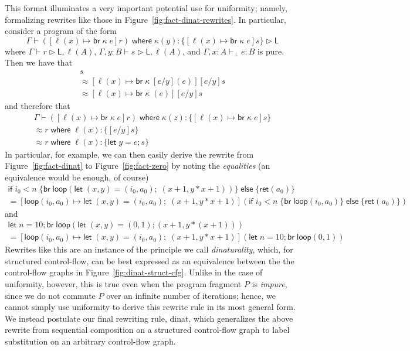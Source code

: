 \documentclass[acmsmall,screen,review]{acmart}
\newcommand{\ms}[1]{\ensuremath{\mathsf{#1}}}
\newcommand{\lto}{:}
\newcommand{\letexpr}[3]{\ensuremath{\ms{let}\;#1 = #2;\;#3}}
\newcommand{\letstmt}[3]{\ensuremath{\ms{let}\;#1 = #2; #3}}
\newcommand{\brb}[2]{\ms{br}\;#1\;#2}
\newcommand{\where}[2]{#1\;\ms{where}\;#2}
\newcommand{\wbranch}[3]{#1(#2) \lto \{#3\}}
\newcommand{\bhyp}[2]{#1 : #2}
\newcommand{\hasty}[4]{#1 \vdash_{#2} #3: {#4}}
\newcommand{\haslb}[3]{#1 \vdash #2 \rhd #3}
\newcommand{\teqv}{\approx}
\newcommand{\brle}[1]{{\textsf{#1}}}
\begin{document}
This format illuminates a very important potential use for uniformity; namely, formalizing rewrites
like those in Figure~\ref{fig:fact-dinat-rewrites}. In particular, consider a program of the form
\begin{equation*}
  \haslb{\Gamma}{\where{([\ell(x) \mapsto \brb{\kappa}{e}]r)}{
    \wbranch{\kappa}{y}{[\ell(x) \mapsto \brb{\kappa}{e}]s}
  }}{\ms{L}}
\end{equation*}
where $\haslb{\Gamma}{r}{\ms{L}, \ell(A)}$, $\haslb{\Gamma, y : B}{s}{\ms{L}, \ell(A)}$, and
$\hasty{\Gamma, \bhyp{x}{A}}{\bot}{e}{B}$ is pure. Then we have that
\begin{multline*}
  [e/y][\ell(x) \mapsto \brb{\kappa}{(e)}]s 
  \\ \teqv
  [\ell(x) \mapsto \brb{\kappa}{[e/y](e)}][e/y]s
  \\ \teqv
  [\ell(x) \mapsto \brb{\kappa}{(e)}][e/y]s
\end{multline*}
and therefore that
\begin{multline*}
  \Gamma \vdash \where{([\ell(x) \mapsto \brb{\kappa}{e}]r)}{
    \wbranch{\kappa}{z}{[\ell(x) \mapsto \brb{\kappa}{e}]s}} \\ \teqv
    \where{r}{
    \wbranch{\ell}{x}{[e/y]s}} \\ \teqv
    \where{r}{
    \wbranch{\ell}{x}{\letstmt{y}{e}{s}}} 
\end{multline*}
In particular, for example, we can then easily derive the rewrite from Figure~\ref{fig:fact-dinat}
to Figure~\ref{fig:fact-zero} by noting the \emph{equalities} (an equivalence would be enough, of
course)
\begin{multline*}
  \ms{if}\;i_0 < n\;\{
    \ms{br}\;\ms{loop}(
      \letexpr{(x, y)}{(i_0, a_0)}{(x + 1, y * x + 1)}
    )
  \}\;\ms{else}\;\{
    \ms{ret}(a_0)
  \} \\
  =
  [\ms{loop}(i_0, a_0) \mapsto \letexpr{(x, y)}{(i_0, a_0)}{(x + 1, y * x + 1)}](
    \ms{if}\;i_0 < n\;\{
      \ms{br}\;\ms{loop}(i_0, a_0)
    \}\;\ms{else}\;\{
      \ms{ret}(a_0)
    \}
  )
\end{multline*}
and
\begin{multline*}
  \letstmt{n}{10}{\ms{br}\;\ms{loop}(
    \letstmt{(x, y)}{(0, 1)}{(x + 1, y * (x + 1))}
  )} \\
  =
  [\ms{loop}(i_0, a_0) \mapsto \letexpr{(x, y)}{(i_0, a_0)}{(x + 1, y * x + 1)}](
    \letstmt{n}{10}{\ms{br}\;\ms{loop}(0, 1)}
  )
\end{multline*}
Rewrites like this are an instance of the principle we call \emph{dinaturality}, which, for
structured control-flow, can be best expressed as an equivalence between the the control-flow graphs
in Figure~\ref{fig:dinat-struct-cfg}. Unlike in the case of uniformity, however, this is true even
when the program fragment $P$ is \emph{impure}, since we do not commute $P$ over an infinite number
of iterations; hence, we cannot simply use uniformity to derive this rewrite rule in its most
general form. We instead postulate our final rewriting rule, \brle{dinat}, which generalizes the
above rewrite from sequential composition on a structured control-flow graph to label substitution
on an arbitrary control-flow graph. 
\end{document}
